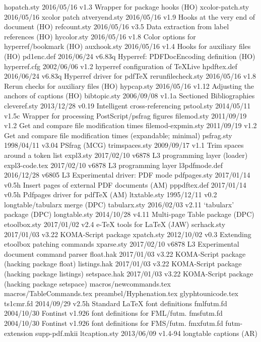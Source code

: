  hopatch.sty    2016/05/16 v1.3 Wrapper for package hooks (HO)
xcolor-patch.sty    2016/05/16 xcolor patch
atveryend.sty    2016/05/16 v1.9 Hooks at the very end of document (HO)
refcount.sty    2016/05/16 v3.5 Data extraction from label references (HO)
 hycolor.sty    2016/05/16 v1.8 Color options for hyperref/bookmark (HO)
 auxhook.sty    2016/05/16 v1.4 Hooks for auxiliary files (HO)
  pd1enc.def    2016/06/24 v6.83q Hyperref: PDFDocEncoding definition (HO)
hyperref.cfg    2002/06/06 v1.2 hyperref configuration of TeXLive
 hpdftex.def    2016/06/24 v6.83q Hyperref driver for pdfTeX
rerunfilecheck.sty    2016/05/16 v1.8 Rerun checks for auxiliary files (HO)
  hypcap.sty    2016/05/16 v1.12 Adjusting the anchors of captions (HO)
bibtopic.sty    2006/09/08 v1.1a Sectioned Bibliographies
cleveref.sty    2013/12/28 v0.19 Intelligent cross-referencing
  pstool.sty    2014/05/11 v1.5c Wrapper for processing PostScript/psfrag figures
 filemod.sty    2011/09/19 v1.2 Get and compare file modification times
filemod-expmin.sty    2011/09/19 v1.2 Get and compare file modification times (expandable; minimal)
  psfrag.sty    1998/04/11 v3.04 PSfrag (MCG)
trimspaces.sty    2009/09/17 v1.1 Trim spaces around a token list
   expl3.sty    2017/02/10 v6878 L3 programming layer (loader) 
expl3-code.tex    2017/02/10 v6878 L3 programming layer 
l3pdfmode.def    2016/12/28 v6805 L3 Experimental driver: PDF mode
pdfpages.sty    2017/01/14 v0.5h Insert pages of external PDF documents (AM)
pppdftex.def    2017/01/14 v0.5h Pdfpages driver for pdfTeX (AM)
ltxtable.sty    1995/12/11 v0.2 longtable/tabularx merge (DPC)
tabularx.sty    2016/02/03 v2.11 `tabularx' package (DPC)
longtable.sty    2014/10/28 v4.11 Multi-page Table package (DPC)
etoolbox.sty    2017/01/02 v2.4 e-TeX tools for LaTeX (JAW)
 scrhack.sty    2017/01/03 v3.22 KOMA-Script package 
  xpatch.sty    2012/10/02 v0.3 Extending etoolbox patching commands
  xparse.sty    2017/02/10 v6878 L3 Experimental document command parser
   float.hak    2017/01/03 v3.22 KOMA-Script package (hacking package float)
listings.hak    2017/01/03 v3.22 KOMA-Script package (hacking package listings)
setspace.hak    2017/01/03 v3.22 KOMA-Script package (hacking package setspace)
macros/newcommands.tex
macros/TableCommands.tex
preambel/Hyphenation.tex
glyphtounicode.tex
  ts1cmr.fd    2014/09/29 v2.5h Standard LaTeX font definitions
 fmlfutm.fd    2004/10/30 Fontinst v1.926 font definitions for FML/futm.
 fmsfutm.fd    2004/10/30 Fontinst v1.926 font definitions for FMS/futm.
 fmxfutm.fd    futm-extension
supp-pdf.mkii
ltcaption.sty    2013/06/09 v1.4-94 longtable captions (AR)
